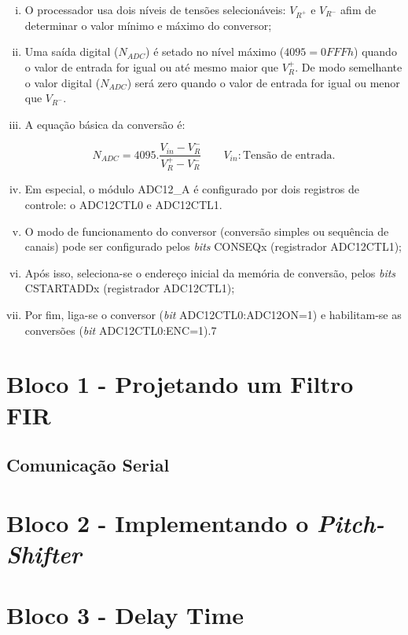 		\begin{enumerate}[(i)]
			\item O processador usa dois níveis de tensões selecionáveis: $V_{R^{+}} $ e $ V_{R^{-}} $ afim de determinar o valor mínimo e máximo do conversor;
			\item Uma saída digital ($ N_{ADC} $) é setado no nível máximo ($ 4095 = 0FFFh $) quando o valor de entrada for igual ou até mesmo maior que $ V_R^+ $. De modo semelhante o valor digital ($ N_{ADC} $) será zero quando o valor de entrada for igual ou menor que $ V_{R^-} $.
			\item A equação básica da conversão é:
			
			\begin{equation}
				\label{eq-adc12-formula}
				N_{ADC} = 4095.\frac{V_{in}-V_R^-}{V_R^+ - V_R^-}
				\qquad
				V_{in}: \text{Tensão de entrada}.
			\end{equation}
			\item Em especial, o módulo ADC12\_A é configurado por dois registros de controle: o ADC12CTL0 e ADC12CTL1.
			\item  O modo de funcionamento do conversor (conversão simples ou sequência de canais) pode ser configurado pelos \textit{bits} CONSEQx (registrador ADC12CTL1);
			\item Após isso, seleciona-se o endereço inicial da memória de conversão, pelos \textit{bits} CSTARTADDx (registrador ADC12CTL1);
			\item Por fim, liga-se o conversor (\textit{bit} ADC12CTL0:ADC12ON=1) e habilitam-se as conversões (\textit{bit} ADC12CTL0:ENC=1).7
		\end{enumerate}
	
	
\section{Bloco 1 - Projetando um Filtro FIR}
	\subsection{Comunicação Serial}
		
\section{Bloco 2 - Implementando o \textit{Pitch-Shifter}}

\section{Bloco 3 - Delay Time}